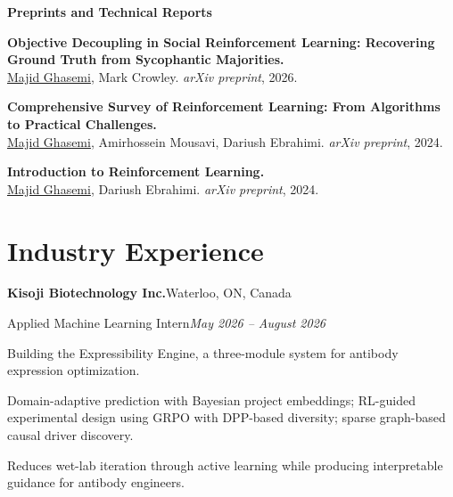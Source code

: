 \documentclass[letterpaper,11pt]{article}
\newcommand{\role}[2]{\textbf{#1}\hfill{#2}\par}
\newcommand{\sub}[2]{#1\hfill\textit{#2}\par}
\newcommand{\gap}{\vspace{0.7em}}
\newcommand{\me}{\underline{Majid Ghasemi}}
\begin{document}

\textbf{\small Preprints and Technical Reports}
\begin{plist}
  \item \textbf{Objective Decoupling in Social Reinforcement Learning: Recovering Ground Truth from Sycophantic Majorities.}\\
        \me, Mark Crowley.
        \textit{arXiv preprint}, 2026.
  \item \textbf{Comprehensive Survey of Reinforcement Learning: From Algorithms to Practical Challenges.}\\
        \me, Amirhossein Mousavi, Dariush Ebrahimi.
        \textit{arXiv preprint}, 2024.
  \item \textbf{Introduction to Reinforcement Learning.}\\
        \me, Dariush Ebrahimi.
        \textit{arXiv preprint}, 2024.
\end{plist}


\section{Industry Experience}

\role{Kisoji Biotechnology Inc.}{Waterloo, ON, Canada}
\sub{Applied Machine Learning Intern}{May 2026 -- August 2026}
\begin{tight}
  \item Building the Expressibility Engine, a three-module system for antibody expression optimization.
  \item Domain-adaptive prediction with Bayesian project embeddings; RL-guided experimental design using GRPO with DPP-based diversity; sparse graph-based causal driver discovery.
  \item Reduces wet-lab iteration through active learning while producing interpretable guidance for antibody engineers.
\end{tight}
\end{document}
